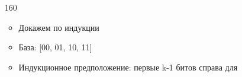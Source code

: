 \documentclass{article}
\author{Бугрий Илья M3134}
\date{November 2023}
\begin{document}
\begin{enumerate}
    \item[160] 
    \begin{itemize}
        \item Докажем по индукции
        \item База: [00, 01, 10, 11]
        \item Индукционное предположение: первые k-1 битов справа для 
    \end{itemize}
\end{enumerate}
\end{document}
